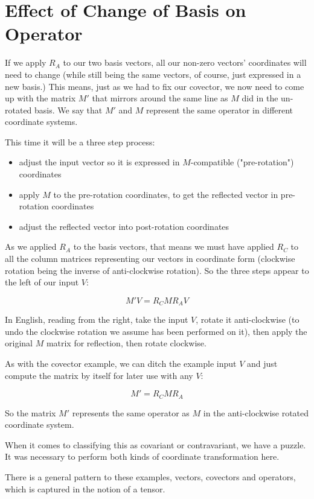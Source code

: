 \section{Effect of Change of Basis on Operator}

If we apply $R_A$ to our two basis vectors, all our non-zero vectors' coordinates will need to change (while still being the same vectors, of course, just expressed in a new basis.) This means, just as we had to fix our covector, we now need to come up with the matrix $M'$ that mirrors around the same line as $M$ did in the un-rotated basis. We say that $M'$ and $M$ represent the same operator in different coordinate systems.

This time it will be a three step process:

\begin{itemize}
    \item adjust the input vector so it is expressed in $M$-compatible ("pre-rotation") coordinates
    \item apply $M$ to the pre-rotation coordinates, to get the reflected vector in pre-rotation coordinates
    \item adjust the reflected vector into post-rotation coordinates
\end{itemize}

As we applied $R_A$ to the basis vectors, that means we must have applied $R_C$ to all the column matrices representing our vectors in coordinate form (clockwise rotation being the inverse of anti-clockwise rotation). So the three steps appear to the left of our input $V$:

$$M'V = R_CMR_AV$$

In English, reading from the right, take the input $V$, rotate it anti-clockwise (to undo the clockwise rotation we assume has been performed on it), then apply the original $M$ matrix for reflection, then rotate clockwise.

As with the covector example, we can ditch the example input $V$ and just compute the matrix by itself for later use with any $V$:

$$M' = R_CMR_A$$

So the matrix $M'$ represents the same operator as $M$ in the anti-clockwise rotated coordinate system.

When it comes to classifying this as covariant or contravariant, we have a puzzle. It was necessary to perform both kinds of coordinate transformation here.

There is a general pattern to these examples, vectors, covectors and operators, which is captured in the notion of a tensor.

